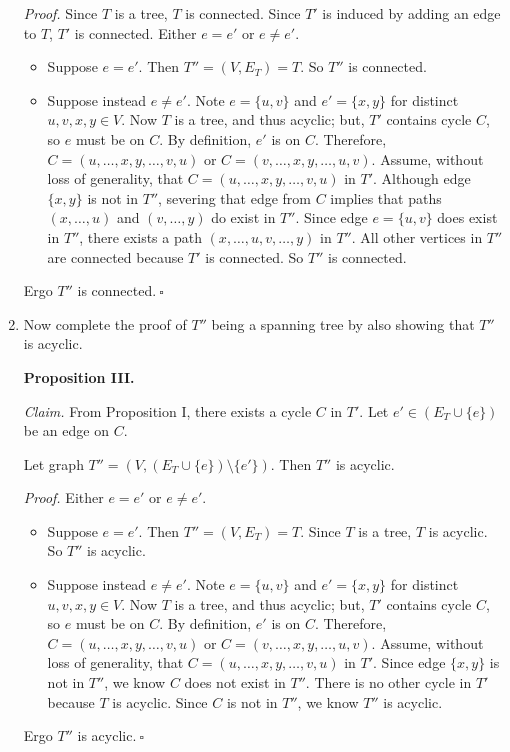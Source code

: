 \begin{enumerate}
\begin{solution}
\textit{Proof. }Since $T$ is a tree, $T$ is connected. Since $T'$ is induced by adding an edge to $T$, $T'$ is connected. Either $e=e'$ or $e\neq e'$.
\begin{itemize}
\item Suppose $e=e'$. Then $T''=(V,E_T)=T$. So $T''$ is connected.
\item Suppose instead $e\neq e'$. Note $e=\{u,v\}$ and $e'=\{x,y\}$ for distinct $u,v,x,y\in V$. Now $T$ is a tree, and thus acyclic; but, $T'$ contains cycle $C$, so $e$ must be on $C$. By definition, $e'$ is on $C$. Therefore, $C=(u,\dots,x,y,\dots,v,u)$ or $C=(v,\dots,x,y,\dots,u,v)$. Assume, without loss of generality, that $C=(u,\dots,x,y,\dots,v,u)$ in $T'$. Although edge $\{x,y\}$ is not in $T''$, severing that edge from $C$ implies that paths $(x,\dots,u)$ and $(v,\dots,y)$ do exist in $T''$. Since edge $e=\{u,v\}$ does exist in $T''$, there exists a path $(x,\dots,u,v,\dots,y)$ in $T''$. All other vertices in $T''$ are connected because $T'$ is connected. So $T''$ is connected.
\end{itemize}
Ergo $T''$ is connected.$~\square$
\end{solution}
\newpage
\item Now complete the proof of $T''$ being a spanning tree by also showing that $T''$ is acyclic.
\begin{solution}

\textbf{Proposition III. }

\textit{Claim. }From Proposition I, there exists a cycle $C$ in $T'$. Let $e'\in(E_T\cup\{e\})$ be an edge on $C$.

Let graph $T''=(V,(E_T\cup\{e\})\setminus\{e'\})$. Then $T''$ is acyclic.

\textit{Proof. }Either $e=e'$ or $e\neq e'$.
\begin{itemize}
    \item Suppose $e=e'$. Then $T''=(V,E_T)=T$. Since $T$ is a tree, $T$ is acyclic. So $T''$ is acyclic.
    \item Suppose instead $e\neq e'$. Note $e=\{u,v\}$ and $e'=\{x,y\}$ for distinct $u,v,x,y\in V$. Now $T$ is a tree, and thus acyclic; but, $T'$ contains cycle $C$, so $e$ must be on $C$. By definition, $e'$ is on $C$. Therefore, $C=(u,\dots,x,y,\dots,v,u)$ or $C=(v,\dots,x,y,\dots,u,v)$. Assume, without loss of generality, that $C=(u,\dots,x,y,\dots,v,u)$ in $T'$. Since edge $\{x,y\}$ is not in $T''$, we know $C$ does not exist in $T''$. There is no other cycle in $T'$ because $T$ is acyclic. Since $C$ is not in $T''$, we know $T''$ is acyclic.
\end{itemize}
Ergo $T''$ is acyclic.$~\square$


\end{solution}
\end{enumerate}
